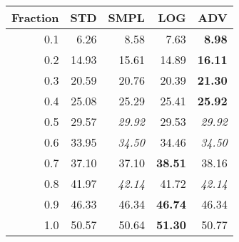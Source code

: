 \documentclass{standalone}
\begin{document}
\begin{tabular}{r|rrrr}
      \toprule
      Fraction & STD & SMPL & LOG & ADV\\
      \midrule
      0.1 & 6.26 & 8.58 & 7.63 & \textbf{8.98}\\
  0.2 & 14.93 & 15.61 & 14.89 & \textbf{16.11}\\
  0.3 & 20.59 & 20.76 & 20.39 & \textbf{21.30}\\
  0.4 & 25.08 & 25.29 & 25.41 & \textbf{25.92}\\
  0.5 & 29.57 & \emph{29.92} & 29.53 & \emph{29.92}\\
  0.6 & 33.95 & \emph{34.50} & 34.46 & \emph{34.50}\\
  0.7 & 37.10 & 37.10 & \textbf{38.51} & 38.16\\
  0.8 & 41.97 & \emph{42.14} & 41.72 & \emph{42.14}\\
  0.9 & 46.33 & 46.34 & \textbf{46.74} & 46.34\\
  1.0 & 50.57 & 50.64 & \textbf{51.30} & 50.77\\
  \bottomrule
\end{tabular}
\end{document}
